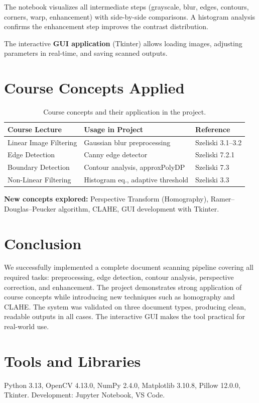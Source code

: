 \documentclass[11pt,a4paper]{article}
\begin{document}
The notebook visualizes all intermediate steps (grayscale, blur, edges, contours, corners, warp, enhancement) with side-by-side comparisons. A histogram analysis confirms the enhancement step improves the contrast distribution.

The interactive \textbf{GUI application} (Tkinter) allows loading images, adjusting parameters in real-time, and saving scanned outputs.

\section{Course Concepts Applied}

\begin{table}[H]
\centering
\small
\begin{tabular}{@{}lll@{}}
\toprule
\textbf{Course Lecture} & \textbf{Usage in Project} & \textbf{Reference} \\
\midrule
Linear Image Filtering & Gaussian blur preprocessing & Szeliski 3.1--3.2 \\
Edge Detection & Canny edge detector & Szeliski 7.2.1 \\
Boundary Detection & Contour analysis, approxPolyDP & Szeliski 7.3 \\
Non-Linear Filtering & Histogram eq., adaptive threshold & Szeliski 3.3 \\
\bottomrule
\end{tabular}
\caption{Course concepts and their application in the project.}
\end{table}

\noindent\textbf{New concepts explored:} Perspective Transform (Homography), Ramer--Douglas--Peucker algorithm, CLAHE, GUI development with Tkinter.

\section{Conclusion}

We successfully implemented a complete document scanning pipeline covering all required tasks: preprocessing, edge detection, contour analysis, perspective correction, and enhancement. The project demonstrates strong application of course concepts while introducing new techniques such as homography and CLAHE. The system was validated on three document types, producing clean, readable outputs in all cases. The interactive GUI makes the tool practical for real-world use.

\section*{Tools and Libraries}
\small
Python 3.13, OpenCV 4.13.0, NumPy 2.4.0, Matplotlib 3.10.8, Pillow 12.0.0, Tkinter. Development: Jupyter Notebook, VS Code.
\end{document}
